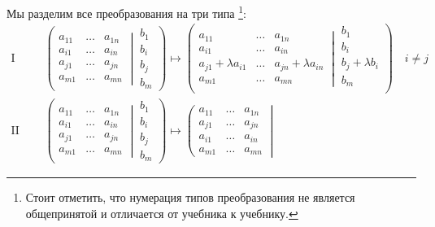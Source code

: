 Мы разделим все преобразования на три типа%
\footnote{Стоит отметить, что нумерация типов преобразования не является общепринятой и отличается от учебника к учебнику.}:
\begin{align*}
\text{I тип: }&
\left(\left.
\begin{matrix}
a_{11}&\ldots&a_{1n}\\
a_{i1}&\ldots&a_{in}\\
a_{j1}&\ldots&a_{jn}\\
a_{m1}&\ldots&a_{mn}
\end{matrix}
\:\right|\:
\begin{matrix}
b_1\\
b_i\\
b_j\\
b_m
\end{matrix}
\right)
\mapsto
\left(\left.
\begin{matrix}
a_{11}&\ldots&a_{1n}\\
a_{i1}&\ldots&a_{in}\\
a_{j1} + \lambda a_{i1}&\ldots&a_{jn}+ \lambda a_{in}\\
a_{m1}&\ldots&a_{mn}
\end{matrix}
\:\right|\:
\begin{matrix}
b_1\\
b_i\\
b_j+ \lambda b_i\\
b_m\\
\end{matrix}
\right)
\quad i\neq j
\\
\text{II тип: }&
\left(\left.
\begin{matrix}
a_{11}&\ldots&a_{1n}\\
a_{i1}&\ldots&a_{in}\\
a_{j1}&\ldots&a_{jn}\\
a_{m1}&\ldots&a_{mn}
\end{matrix}
\:\right|\:
\begin{matrix}
b_1\\
b_i\\
b_j\\
b_m
\end{matrix}
\right)
\mapsto
\left(\left.
\begin{matrix}
a_{11}&\ldots&a_{1n}\\
a_{j1}&\ldots&a_{jn}\\
a_{i1}&\ldots&a_{in}\\
a_{m1}&\ldots&a_{mn}
\end{matrix}
\:\right|\:
\begin{matrix}

\end{matrix}
\end{align*}
